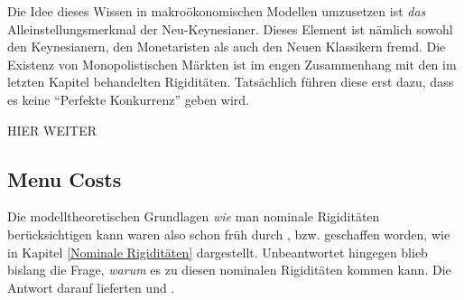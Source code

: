 Die Idee dieses Wissen in makroökonomischen Modellen umzusetzen ist \textit{das} Alleinstellungsmerkmal der Neu-Keynesianer. Dieses Element ist nämlich sowohl den Keynesianern, den Monetaristen als auch den Neuen Klassikern fremd. 
Die Existenz von Monopolistischen Märkten ist im engen Zusammenhang mit den im letzten Kapitel behandelten Rigiditäten. Tatsächlich führen diese erst dazu, dass es keine "`Perfekte Konkurrenz"' geben wird. 

HIER WEITER



\subsection{Menu Costs}
Die modelltheoretischen Grundlagen \textit{wie} man nominale Rigiditäten berücksichtigen kann waren also schon früh durch \textcite{Taylor1977, Fischer1977}, bzw. \textcite{Calvo1983} geschaffen worden, wie in Kapitel \ref{Nominale Rigiditäten} dargestellt. Unbeantwortet hingegen blieb bislang die Frage, \textit{warum} es zu diesen nominalen Rigiditäten kommen kann. Die Antwort darauf lieferten \textcite{Mankiw1985b, Akerlof1985, Parkin1986, RomerDavid1990} und \textcite{Ball1988}. 

